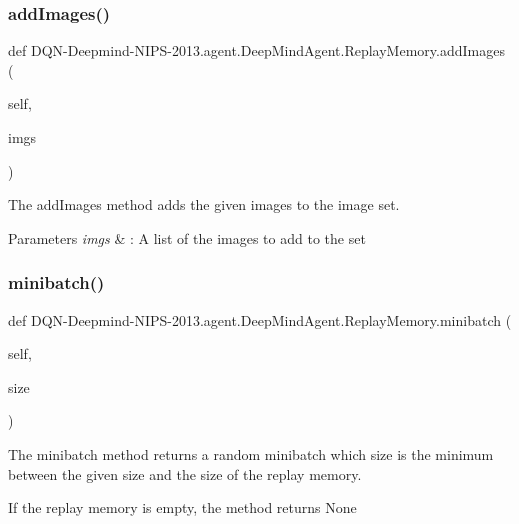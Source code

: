 \subsubsection{\texorpdfstring{add\+Images()}{addImages()}}
{\footnotesize\ttfamily def D\+QN-\/Deepmind-\/N\+I\+PS-\/2013.agent.\+Deep\+Mind\+Agent.\+Replay\+Memory.\+add\+Images (\begin{DoxyParamCaption}\item[{}]{self,  }\item[{}]{imgs }\end{DoxyParamCaption})}



The add\+Images method adds the given images to the image set. 


\begin{DoxyParams}{Parameters}
{\em imgs} & \+: A list of the images to add to the set \\
\hline
\end{DoxyParams}
\hypertarget{classDQN-Deepmind-NIPS-2013_1_1agent_1_1DeepMindAgent_1_1ReplayMemory_a345939d730803f20978861c2ba6cd397}{}\label{classDQN-Deepmind-NIPS-2013_1_1agent_1_1DeepMindAgent_1_1ReplayMemory_a345939d730803f20978861c2ba6cd397} 
\subsubsection{\texorpdfstring{minibatch()}{minibatch()}}
{\footnotesize\ttfamily def D\+QN-\/Deepmind-\/N\+I\+PS-\/2013.agent.\+Deep\+Mind\+Agent.\+Replay\+Memory.\+minibatch (\begin{DoxyParamCaption}\item[{}]{self,  }\item[{}]{size }\end{DoxyParamCaption})}



The minibatch method returns a random minibatch which size is the minimum between the given size and the size of the replay memory. 

If the replay memory is empty, the method returns None


